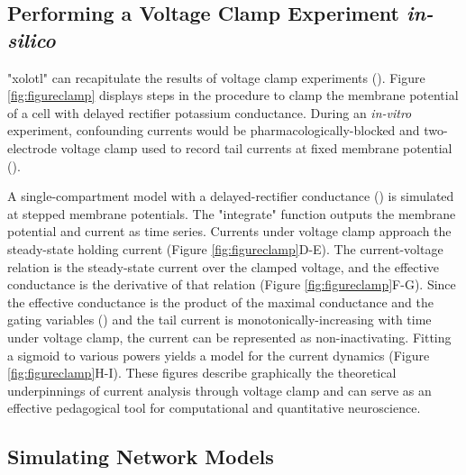 \documentclass{frontiersSCNS} %
\begin{document}
\subsection{Performing a Voltage Clamp Experiment \textit{in-silico}}

"xolotl" can recapitulate the results of voltage clamp experiments (\cite{turrigianoSelectiveRegulationCurrent1995, swensenMultiplePeptidesConverge2000, swensenModulatorsConvergentCellular2001, destexheDynamicClampPrinciplesApplications2009}). Figure \ref{fig:figureclamp} displays steps in the procedure to clamp the membrane potential of a cell with delayed rectifier potassium conductance. During an \textit{in-vitro} experiment, confounding currents would be pharmacologically-blocked and two-electrode voltage clamp used to record tail currents at fixed membrane potential (\cite{connorInwardDelayedOutward1971, connorVoltageClampStudies1971}).

A single-compartment model with a delayed-rectifier conductance (\cite{liuModelNeuronActivitydependent1998}) is simulated at stepped membrane potentials. The "integrate" function outputs the membrane potential and current as time series. Currents under voltage clamp approach the steady-state holding current (Figure \ref{fig:figureclamp}D-E). The current-voltage relation is the steady-state current over the clamped voltage, and the effective conductance is the derivative of that relation (Figure \ref{fig:figureclamp}F-G). Since the effective conductance is the product of the maximal conductance and the gating variables (\cite{dayanTheoreticalNeuroscience2001, turrigianoSelectiveRegulationCurrent1995}) and the tail current is monotonically-increasing with time under voltage clamp, the current can be represented as non-inactivating. Fitting a sigmoid to various powers yields a model for the current dynamics (Figure \ref{fig:figureclamp}H-I). These figures describe graphically the theoretical underpinnings of current analysis through voltage clamp and can serve as an effective pedagogical tool for computational and quantitative neuroscience.

%
%
%
%
%
%

\subsection{Simulating Network Models}
\end{document}
